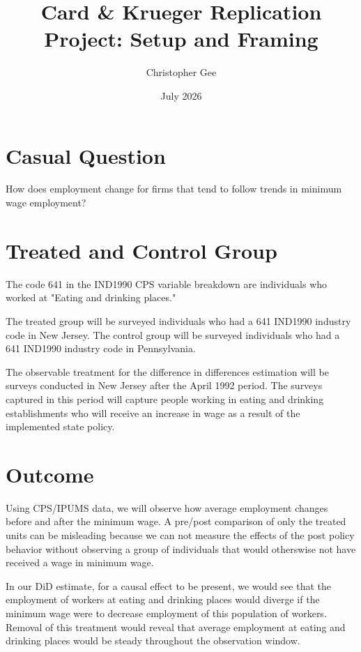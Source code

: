 \documentclass[11pt]{article}
\title{Card \& Krueger Replication Project: Setup and Framing}
\author{Christopher Gee}
\date{July 2026}
\begin{document}
\maketitle

\section*{Casual Question}

How does employment change for firms that tend to follow trends in minimum wage employment?

\section*{Treated and Control Group}

The code 641 in the IND1990 CPS variable breakdown are individuals who worked at "Eating and drinking places."

The treated group will be surveyed individuals who had a 641 IND1990 industry code in New Jersey. The control group will be surveyed individuals who had a 641 IND1990 industry code in Pennsylvania. 

The observable treatment for the difference in differences estimation will be surveys conducted in New Jersey after the April 1992 period. The surveys captured in this period will capture people working in eating and drinking establishments who will receive an increase in wage as a result of the implemented state policy. 

 \section*{Outcome}

Using CPS/IPUMS data, we will observe how average employment changes before and after the minimum wage. A pre/post comparison of only the treated units can be misleading because we can not measure the effects of the post policy behavior without observing a group of individuals that would otherswise not have received a wage in minimum wage. 

In our DiD estimate, for a causal effect to be present, we would see that the employment of workers at eating and drinking places would diverge if the minimum wage were to decrease employment of this population of workers. Removal of this treatment would reveal that average employment at eating and drinking places would be steady throughout the observation window. 
\end{document}
